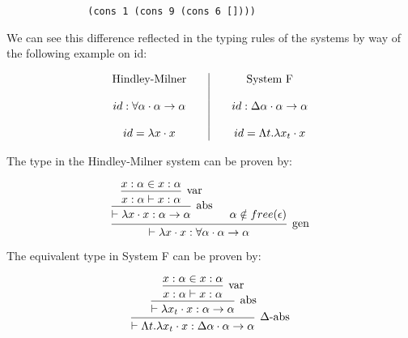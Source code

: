 \documentclass{ProgressReport}[2020/09/15]
\begin{document}
            \begin{verbatim}
              (cons 1 (cons 9 (cons 6 [])))  
            \end{verbatim}
            
            We can see this difference reflected in the typing rules of the
            systems by way of the following example on id:
            
            \[\begin{array}{c@{\qquad}|@{\qquad}c}
                  \mbox{Hindley-Milner}
                  &
                  \mbox{System F}
                  \\\\
                  id : \forall \alpha \cdot \alpha \to \alpha
                  &
                  id : \Delta \alpha \cdot \alpha \to \alpha
                  \\\\
                  id = \lambda x \cdot x
                  &
                  id = \Lambda t . \lambda x_t \cdot x
            \end{array} \]
            
            The type in the Hindley-Milner system can be proven by:
            
            
            \[\begin{array}{c}
            \mbox{\begin{prooftree}
                    \hypo{x : \alpha \in x : \alpha}   
                  \infer1[var]{x : \alpha \vdash x : \alpha}
                \infer1[abs]{\vdash \lambda x \cdot x : \alpha \to \alpha}
                \hypo{\alpha \notin free(\epsilon)}
               \infer2[gen]{\vdash \lambda x \cdot x : \forall \alpha \cdot
               \alpha \to \alpha}
            \end{prooftree}}
            \end{array} \]
            
            
            The equivalent type in System F can be proven by:
            
            \[\begin{array}{c}
            \mbox{\begin{prooftree}
                  \hypo{x : \alpha \in x : \alpha}
                \infer1[var]{x : \alpha \vdash x : \alpha}
               \infer1[abs]{\vdash \lambda x_t \cdot x : \alpha \to \alpha}
               \infer1[$\Delta$-abs]{\vdash \Lambda t . \lambda x_t \cdot
                 x : \Delta \alpha \cdot \alpha \to \alpha}
            \end{prooftree}}
            \end{array} \]
            
\end{document}
